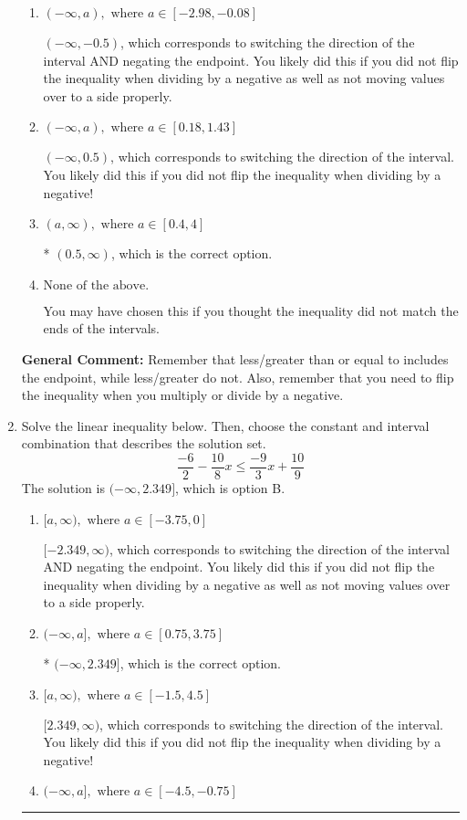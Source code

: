 \documentclass{extbook}[14pt]
\newcommand{\litem}[1]{\item #1

\rule{\textwidth}{0.4pt}}
\begin{document}
\begin{enumerate}
{\begin{enumerate}[label=\Alph*.]
 $(-0.5, \infty)$, which corresponds to negating the endpoint of the solution.
\item \( (-\infty, a), \text{ where } a \in [-2.98, -0.08] \)

 $(-\infty, -0.5)$, which corresponds to switching the direction of the interval AND negating the endpoint. You likely did this if you did not flip the inequality when dividing by a negative as well as not moving values over to a side properly.
\item \( (-\infty, a), \text{ where } a \in [0.18, 1.43] \)

 $(-\infty, 0.5)$, which corresponds to switching the direction of the interval. You likely did this if you did not flip the inequality when dividing by a negative!
\item \( (a, \infty), \text{ where } a \in [0.4, 4] \)

* $(0.5, \infty)$, which is the correct option.
\item \( \text{None of the above}. \)

You may have chosen this if you thought the inequality did not match the ends of the intervals.
\end{enumerate}

\textbf{General Comment:} Remember that less/greater than or equal to includes the endpoint, while less/greater do not. Also, remember that you need to flip the inequality when you multiply or divide by a negative.
}
\litem{
Solve the linear inequality below. Then, choose the constant and interval combination that describes the solution set.
\[ \frac{-6}{2} - \frac{10}{8} x \leq \frac{-9}{3} x + \frac{10}{9} \]The solution is \( (-\infty, 2.349] \), which is option B.\begin{enumerate}[label=\Alph*.]
\item \( [a, \infty), \text{ where } a \in [-3.75, 0] \)

 $[-2.349, \infty)$, which corresponds to switching the direction of the interval AND negating the endpoint. You likely did this if you did not flip the inequality when dividing by a negative as well as not moving values over to a side properly.
\item \( (-\infty, a], \text{ where } a \in [0.75, 3.75] \)

* $(-\infty, 2.349]$, which is the correct option.
\item \( [a, \infty), \text{ where } a \in [-1.5, 4.5] \)

 $[2.349, \infty)$, which corresponds to switching the direction of the interval. You likely did this if you did not flip the inequality when dividing by a negative!
\item \( (-\infty, a], \text{ where } a \in [-4.5, -0.75] \)


\end{enumerate}}
\end{enumerate}
\end{document}
